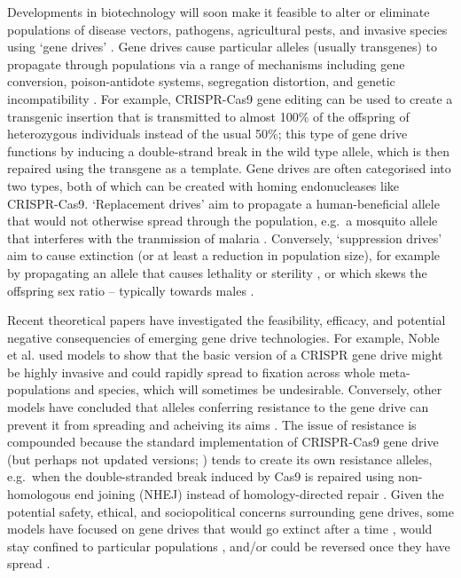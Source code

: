 \documentclass[]{rsos}%
\begin{document}
Developments in biotechnology will soon make it feasible to alter or
eliminate populations of disease vectors, pathogens, agricultural pests,
and invasive species using `gene drives'
\citep{gantz2015hi, hammond2016cr, wang2016cr, prowse2017do, kyrou2018cr, noble2018cu}.
Gene drives cause particular alleles (usually transgenes) to propagate
through populations via a range of mechanisms including gene conversion,
poison-antidote systems, segregation distortion, and genetic
incompatibility \citep{lindholm2016ec, champer2016ch, oberhofer2019cl}.
For example, CRISPR-Cas9 gene editing can be used to create a transgenic
insertion that is transmitted to almost 100\% of the offspring of
heterozygous individuals instead of the usual 50\%; this type of gene
drive functions by inducing a double-strand break in the wild type
allele, which is then repaired using the transgene as a template. Gene
drives are often categorised into two types, both of which can be
created with homing endonucleases like CRISPR-Cas9. `Replacement drives'
aim to propagate a human-beneficial allele that would not otherwise
spread through the population, e.g.~a mosquito allele that interferes
with the tranmission of malaria \citep{gantz2015hi, marshall2015gene}.
Conversely, `suppression drives' aim to cause extinction (or at least a
reduction in population size), for example by propagating an allele that
causes lethality or sterility
\citep{hammond2016cr, kyrou2018cr, maselko2018ge}, or which skews the
offspring sex ratio -- typically towards males
\citep{windbichler2008ta, galizi2014sy, beaghton2017ve, burt2018se, papathanos2018re}.

Recent theoretical papers have investigated the feasibility, efficacy,
and potential negative consequencies of emerging gene drive
technologies. For example, Noble et al. \citep{noble2018cu} used models
to show that the basic version of a CRISPR gene drive might be highly
invasive and could rapidly spread to fixation across whole
meta-populations and species, which will sometimes be undesirable.
Conversely, other models have concluded that alleles conferring
resistance to the gene drive can prevent it from spreading and acheiving
its aims \citep{drury2017cr, unckless2017ev}. The issue of resistance is
compounded because the standard implementation of CRISPR-Cas9 gene drive
(but perhaps not updated versions;
\citep{esvelt2014em, unckless2017ev, prowse2017do, kyrou2018cr}) tends
to create its own resistance alleles, e.g.~when the double-stranded
break induced by Cas9 is repaired using non-homologous end joining
(NHEJ) instead of homology-directed repair
\citep{gantz2015mu, gantz2015hi, hammond2016cr, wang2016cr, unckless2017ev}.
Given the potential safety, ethical, and sociopolitical concerns
surrounding gene drives, some models have focused on gene drives that
would go extinct after a time
\citep{min2017da, burt2018se, noble2019da}, would stay confined to
particular populations \citep{maselko2018ge, noble2019da}, and/or could
be reversed once they have spread \citep{vella2017ev}.
\end{document}
